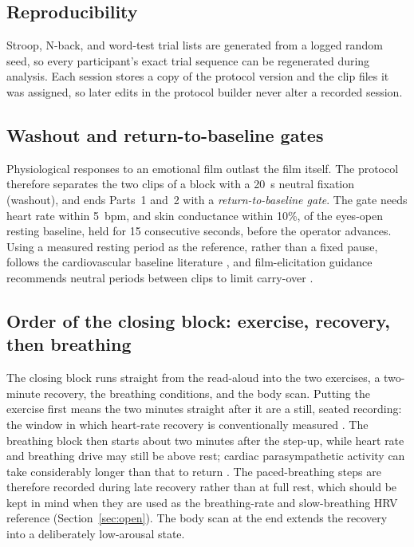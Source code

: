 \documentclass[11pt,a4paper]{article}
\begin{document}
\subsection*{Reproducibility}
Stroop, N-back, and word-test trial lists are generated from a logged random seed, so every participant's exact
trial sequence can be regenerated during analysis. Each session stores a copy of the protocol version and the clip
files it was assigned, so later edits in the protocol builder never alter a recorded session.

\subsection*{Washout and return-to-baseline gates}
Physiological responses to an emotional film outlast the film itself. The protocol therefore separates the two
clips of a block with a 20~s neutral fixation (washout), and ends Parts~1 and~2 with a \emph{return-to-baseline
gate}. The gate needs heart rate within 5~bpm, and skin conductance within 10\%, of the eyes-open resting baseline,
held for 15 consecutive seconds, before the operator advances. Using a measured resting period as the reference,
rather than a fixed pause, follows the cardiovascular baseline literature \cite{jennings1992}, and film-elicitation
guidance recommends neutral periods between clips to limit carry-over \cite{rottenberg2007}.

\subsection*{Order of the closing block: exercise, recovery, then breathing}
The closing block runs straight from the read-aloud into the two exercises, a two-minute recovery, the breathing
conditions, and the body scan. Putting the exercise first means the two minutes straight after it are a still,
seated recording: the window in which heart-rate recovery is conventionally measured \cite{cole1999}. The breathing
block then starts about two minutes after the step-up, while heart rate and breathing drive may still be above
rest; cardiac parasympathetic activity can take considerably longer than that to return \cite{stanley2013}. The
paced-breathing steps are therefore recorded during late recovery rather than at full rest, which should be kept in
mind when they are used as the breathing-rate and slow-breathing HRV reference (Section~\ref{sec:open}). The body
scan at the end extends the recovery into a deliberately low-arousal state.
\end{document}
